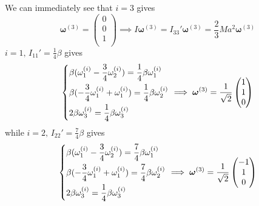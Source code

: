 \documentclass{article}
\begin{document}
        We can immediately see that $i = 3$ gives
        \begin{equation*}
            \boldsymbol{\omega}^{(3)} = 
            \begin{pmatrix}
                0 \\
                0 \\
                1 \\
            \end{pmatrix}
            \implies I \boldsymbol{\omega}^{(3)} = I_{33}' \boldsymbol{\omega}^{(3)}  = \frac{2}{3} Ma^2 \boldsymbol{\omega}^{(3)} 
        \end{equation*}
        $i= 1, \, I_{11}' = \frac{1}{4}\beta$ gives
        \begin{equation*}
            \begin{dcases*}
                \beta (\omega^{(i)}_1 - \frac{3}{4} \omega^{(i)}_2) = \frac{1}{4}\beta\omega^{(i)}_1 \\
                \beta (- \frac{3}{4} \omega^{(i)}_1 + \omega^{(i)}_1) = \frac{1}{4}\beta \omega^{(i)}_2 \\
                2 \beta \omega^{(i)}_3 = \frac{1}{4}\beta \omega^{(i)}_3
            \end{dcases*}
            \implies 
            \boldsymbol{\omega}^{(3)} = \frac{1}{\sqrt{2}}
                \begin{pmatrix}
                    1 \\
                    1 \\
                    0 \\
                \end{pmatrix}
        \end{equation*}
        while $i = 2, \, I_{22}' = \frac{7}{4}\beta$ gives
        \begin{equation*}
            \begin{dcases*}
                \beta (\omega^{(i)}_1 - \frac{3}{4} \omega^{(i)}_2) = \frac{7}{4}\beta\omega^{(i)}_1 \\
                \beta (- \frac{3}{4} \omega^{(i)}_1 + \omega^{(i)}_1) = \frac{7}{4}\beta \omega^{(i)}_2 \\
                2 \beta \omega^{(i)}_3 = \frac{1}{4}\beta \omega^{(i)}_3
            \end{dcases*}
            \implies 
            \boldsymbol{\omega}^{(3)} = \frac{1}{\sqrt{2}}
                \begin{pmatrix}
                    -1 \\
                    1 \\
                    0 \\
                \end{pmatrix}
        \end{equation*}
    
\end{document}
